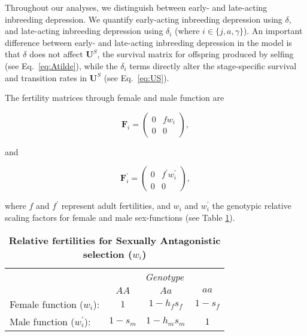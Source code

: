 \documentclass[11pt]{article}
\def\mbf#1{\mathbf{#1}}
\begin{document}
Throughout our analyses, we distinguish between early- and late-acting inbreeding depression. We quantify early-acting inbreeding depression using $\delta$, and late-acting inbreeding depression using $\delta_i$ (where $i \in \{j,a,\gamma\}$). An important difference between early- and late-acting inbreeding depression in the model is that $\delta$ does not affect $\mbf{U}^S$, the survival matrix for offspring produced by selfing (see Eq.~\ref{eq:Atilde}), while the $\delta_i$ terms directly alter the stage-specific survival and transition rates in $\mbf{U}^S$ (see Eq.~\ref{eq:US}).

The fertility matrices through female and male function are
\begin{linenomath*}
\begin{equation}\label{eq:FS}
	\mbf{F}_{i} = \left(
					\begin{array}{cc}
						0 & f w_{i} \\
						0 & 0
					\end{array}
				\right),
\end{equation}
\end{linenomath*}
\noindent and
\begin{linenomath*}
\begin{equation}\label{eq:FX}
	\mbf{F}^{\prime}_{i} = \left(
					\begin{array}{cc}
						0 & f^{\prime} w^{\prime}_{i} \\
						0 & 0
					\end{array}
				\right),
\end{equation}
\end{linenomath*}

\noindent where $f$ and $f^{\prime}$ represent adult fertilities, and $w_{i}$ and $w^{\prime}_{i}$ the genotypic relative scaling factors for female and male sex-functions (see Table \ref{tab:Fitness}). 

\begin{table}[htbp]
 \centering
 \caption{\bf Relative fertilities for Sexually Antagonistic selection ($w_{i}$)}
\label{tab:Fitness}
\begin{tabular}{lccc}
 \toprule
					&  \multicolumn{3}{c}{{\textit{Genotype}}} \\ 
\cline{2-4}
					& $AA$			& $Aa$ 					& $aa$ 		\\ \hline
Female function ($w_{i}$):	& $1$		& $1 - h_f s_f$	& $1 - s_f$ \\	
Male function ($w^{\prime}_{i}$):		& $1 - s_m$& $1 - h_m s_m$	& $1$ 		\\	
\hline
\end{tabular}
\end{table}
\end{document}
